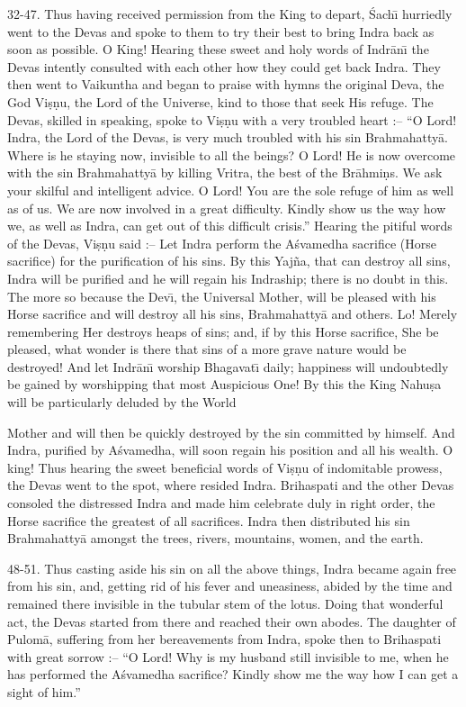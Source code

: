 32-47. Thus having received permission from the King to depart, \'Sach\={\i} hurriedly went to the Devas and spoke to them to try their best to bring Indra back as soon as possible. O King! Hearing these sweet and holy words of Indr\=an\={\i} the Devas intently consulted with each other how they could get back Indra. They then went to Vaikuntha and began to praise with hymns the original Deva, the God Vi\d{s}\d{n}u, the Lord of the Universe, kind to those that seek His refuge. The Devas, skilled in speaking, spoke to Vi\d{s}\d{n}u with a very troubled heart :-- ``O Lord! Indra, the Lord of the Devas, is very much troubled with his sin Brahmahatty\=a. Where is he staying now, invisible to all the beings? O Lord! He is now overcome with the sin Brahmahatty\=a by killing Vritra, the best of the Br\=ahmi\d{n}s. We ask your skilful and intelligent advice. O Lord! You are the sole refuge of him as well as of us. We are now involved in a great difficulty. Kindly show us the way how we, as well as Indra, can get out of this difficult crisis.'' Hearing the pitiful words of the Devas, Vi\d{s}\d{n}u said :-- Let Indra perform the A\'svamedha sacrifice (Horse sacrifice) for the purification of his sins. By this Yaj\~na, that can destroy all sins, Indra will be purified and he will regain his Indraship; there is no doubt in this. The more so because the Dev\={\i}, the Universal Mother, will be pleased with his Horse sacrifice and will destroy all his sins, Brahmahatty\=a and others. Lo! Merely remembering Her destroys heaps of sins; and, if by this Horse sacrifice, She be pleased, what wonder is there that sins of a more grave nature would be destroyed! And let Indr\=an\={\i} worship Bhagavat\={\i} daily; happiness will undoubtedly be gained by worshipping that most Auspicious One! By this the King Nahu\d{s}a will be particularly deluded by the World

Mother and will then be quickly destroyed by the sin committed by himself. And Indra, purified by A\'svamedha, will soon regain his position and all his wealth. O king! Thus hearing the sweet beneficial words of Vi\d{s}\d{n}u of indomitable prowess, the Devas went to the spot, where resided Indra. Brihaspati and the other Devas consoled the distressed Indra and made him celebrate duly in right order, the Horse sacrifice the greatest of all sacrifices. Indra then distributed his sin Brahmahatty\=a amongst the trees, rivers, mountains, women, and the earth.

48-51. Thus casting aside his sin on all the above things, Indra became again free from his sin, and, getting rid of his fever and uneasiness, abided by the time and remained there invisible in the tubular stem of the lotus. Doing that wonderful act, the Devas started from there and reached their own abodes. The daughter of Pulom\=a, suffering from her bereavements from Indra, spoke then to Brihaspati with great sorrow :-- ``O Lord! Why is my husband still invisible to me, when he has performed the A\'svamedha sacrifice? Kindly show me the way how I can get a sight of him.''

